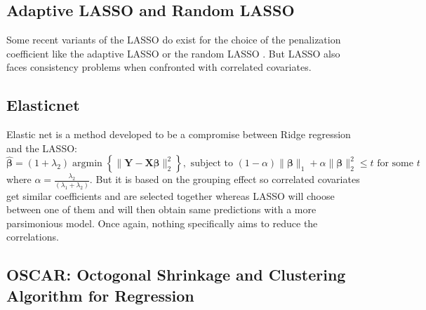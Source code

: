 \documentclass[12pt,a4paper]{report}
\begin{document}
		\subsection{Adaptive LASSO and Random LASSO}		%

			\cite{zou2006adaptive}%
			\cite{wang2011random}%
			 Some recent variants of the \textsc{LASSO} do exist for the choice of the penalization coefficient like the adaptive \textsc{LASSO} \cite{zou2006adaptive} or the random \textsc{LASSO} \cite{wang2011random}.  But \textsc{LASSO} also faces consistency problems \cite{Zhao2006MSC} when confronted with correlated covariates.
		\subsection{Elasticnet}		%

			\cite{zou2005regularization}
			Elastic net \cite{zou2005regularization} is a method developed to be a compromise between Ridge regression and the \textsc{LASSO}: 
	\begin{equation}
		\boldsymbol{\hat{\beta}}=(1+\lambda_2) \operatorname{argmin}\left\lbrace \parallel \boldsymbol{Y}-\boldsymbol{X\beta} \parallel_2^2 \right\rbrace, \textrm{ subject to } (1-\alpha)\parallel\boldsymbol{\beta}\parallel_1+\alpha\parallel\boldsymbol{\beta}\parallel_2^2\leq t \textrm{ for some } t
	\end{equation}
	where $\alpha=\frac{\lambda_2}{(\lambda_1+\lambda_2)}$. 
	But it is based on the grouping effect so correlated covariates get similar coefficients and are selected together whereas LASSO will choose between one of them and will then obtain same predictions with a more parsimonious model. Once again, nothing specifically aims to reduce the correlations. %
		\subsection{OSCAR: Octogonal Shrinkage and Clustering Algorithm for Regression }		%
\end{document}
